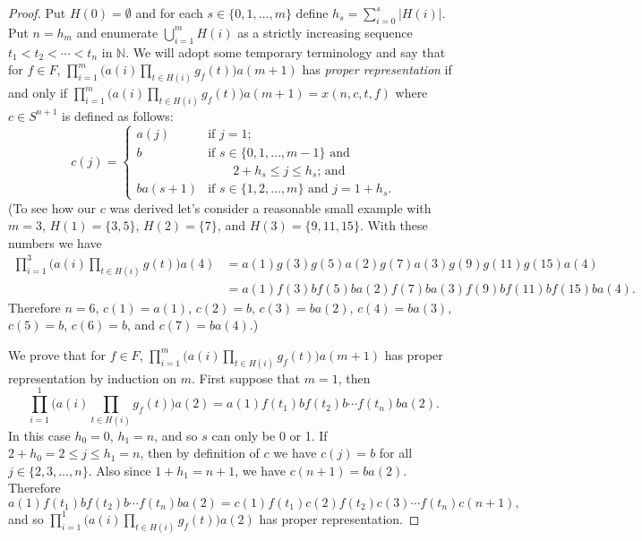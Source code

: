 \documentclass[12pt,showtrims]{memoir}
\theoremstyle{plain}
\theoremstyle{definition}
\newcommand{\bbN}{\mathbb{N}}
\begin{document}
\begin{proof}
  Put $H(0) = \emptyset$ and for each $s \in \{0, 1, \ldots, m\}$ define $h_s = \sum_{i=0}^s |H(i)|$.
  Put $n = h_m$ and enumerate $\bigcup_{i=1}^m H(i)$ as a strictly increasing sequence $t_1 < t_2 < \cdots < t_n$ in $\bbN$. 
  We will adopt some temporary terminology and say that for $f \in F$, $\prod_{i=1}^m \bigl( a(i) \prod_{t \in H(i)} g_f(t) \bigr) a(m+1)$ has \emph{proper representation} if and only if $\prod_{i=1}^m \bigl( a(i) \prod_{t \in H(i)} g_f(t) \bigr) a(m+1) = x(n, c, t, f)$ where $c \in S^{n+1}$ is defined as follows:
  \[
    c(j) = 
    \begin{cases}
      a(j) & \mbox{if $j = 1$;} \\
      b & \mbox{if $s \in \{0, 1, \ldots, m-1\}$ and} \\
      &   \hspace{2em}\mbox{$2+h_s \le j \le h_s$; and} \\
      ba(s+1) & \mbox{if $s \in \{1, 2, \ldots, m\}$ and $j = 1+h_s$.}
    \end{cases}
  \]
  {
    (To see how our $c$ was derived let's consider a reasonable small example with $m = 3$, $H(1) = \{3, 5\}$, $H(2) = \{7\}$, and $H(3) = \{9, 11, 15\}$.
    With these numbers we have
    \begin{align*}
      \textstyle
      \prod_{i=1}^3 \bigl( a(i) \prod_{t \in H(i)} g(t) \bigr) a(4) &=
      a(1) g(3)g(5) a(2) g(7) a(3) g(9)g(11)g(15) a(4) \\
      &= a(1) f(3)bf(5)b a(2) f(7)b a(3) f(9)bf(11)bf(15)b a(4).
    \end{align*}
    Therefore $n = 6$, $c(1) = a(1)$, $c(2) = b$, $c(3) = ba(2)$, $c(4) = ba(3)$, $c(5) = b$,  $c(6) = b$, and $c(7) = ba(4)$.)
  }

  We prove that for $f \in F$, $\prod_{i=1}^m \bigl( a(i) \prod_{t \in H(i)} g_f(t) \bigr) a(m+1)$ has proper representation by induction on $m$. 
  First suppose that $m = 1$, then 
  \[
    \textstyle
    \prod_{i=1}^1 \bigl( a(i) \prod_{t \in H(i)} g_f(t) \bigr) a(2) = a(1) f(t_1)b  f(t_2)b \cdots f(t_n)b a(2).
  \]
  In this case $h_0 = 0$, $h_1 = n$, and so $s$ can only be 0 or 1.
  If $2+h_0 = 2 \le j \le h_1 = n$, then by definition of $c$ we have $c(j) = b$ for all $j \in \{2, 3, \ldots, n\}$. 
  Also since $1 + h_1 = n+1$, we have $c(n+1) = ba(2)$. 
  Therefore
  \[
    \textstyle
    a(1) f(t_1)b  f(t_2)b \cdots f(t_n)b a(2) = c(1) f(t_1) c(2) f(t_2) c(3) \cdots f(t_n) c(n+1),
  \]
  and so $\prod_{i=1}^1 \bigl( a(i) \prod_{t \in H(i)} g_f(t) \bigr) a(2)$ has proper representation. 


\end{proof}
\end{document}
